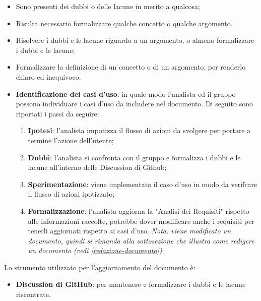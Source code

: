 \label{aggiornare-adr}

\begin{itemize}
	\item Sono presenti dei dubbi o delle lacune in merito a qualcosa;

	\item Risulta necessario formalizzare qualche concetto o qualche argomento.
\end{itemize}

\begin{itemize}
	\item Risolvere i dubbi e le lacune riguardo a un argomento, o almeno
	      formalizzare i dubbi e le lacune;

	\item Formalizzare la definizione di un concetto o di un argomento, per
	      renderlo chiaro ed inequivoco.
\end{itemize}

\begin{itemize}
	\item \textbf{Identificazione dei casi d'uso}: in quale modo l'analista ed
	      il gruppo possono individuare i casi d'uso da includere nel documento.
	      Di seguito sono riportati i passi da seguire:
	      \begin{enumerate}
		      \item \textbf{Ipotesi}: l'analista impotizza il flusso di azioni
		            da svolgere per portare a termine l'azione dell'utente;

		      \item \textbf{Dubbi}: l'analista si confronta con il gruppo e
		            formalizza i dubbi e le lacune all'interno delle Discussion di
		            Github\g;

		      \item \textbf{Sperimentazione}: viene implementato il caso d'uso
		            in modo da verifcare il flusso di azioni ipotizzato;

		      \item \textbf{Formalizzazione}: l'analista aggiorna la "Analisi
		            dei Requisiti" rispetto alle informazioni raccolte, potrebbe
		            dover modificare anche i requisiti per tenerli aggiornati
		            rispetto ai casi d'uso. \textit{Nota: viene modificato un
			            documento, quindi si rimanda alla sottosezione che
			            illustra come redigere un documento (vedi
			            \cref{redazione-documento})}.
	      \end{enumerate}
\end{itemize}

Lo strumento utilizzato per l'aggiornamento del documento è:
\begin{itemize}
	\item \textbf{Discussion di GitHub\g}: per mantenere e formalizzare i dubbi
	      e le lacune riscontrate.
\end{itemize}
